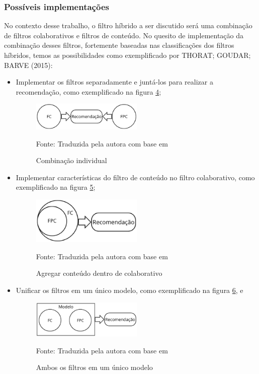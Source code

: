 \subsubsection{Possíveis implementações}\label{subsubsec:implemfh}
No contexto desse trabalho, o filtro híbrido a ser discutido será uma combinação de filtros colaborativos e filtros de 
conteúdo. No quesito de implementação da combinação desses filtros, fortemente baseadas nas classificações dos filtros 
híbridos, temos as possibilidades como exemplificado por THORAT; GOUDAR; BARVE (2015):

\begin{itemize}
    \item Implementar os filtros separadamente e juntá-los para realizar a recomendação, como exemplificado na figura
    \hyperref[fig:combind]{4};
    \begin{figure}[H]
        \centering
        \includegraphics[width=0.5\textwidth]{figuras/combin2.eps}
        \caption{Combinação individual}
        \label{fig:combind}
        \small Fonte: Traduzida pela autora com base em \cite{thorat2015survey}
    \end{figure}

    \item Implementar características do filtro de conteúdo no filtro colaborativo, como exemplificado na figura
    \hyperref[fig:cfcbf]{5};
    \begin{figure}[H]
        \centering
        \includegraphics[width=0.5\textwidth]{figuras/cfcbf2.eps}
        \caption{Agregar conteúdo dentro de colaborativo}
        \label{fig:cfcbf}
        \small Fonte: Traduzida pela autora com base em \cite{thorat2015survey}
    \end{figure}

    \item Unificar os filtros em um único modelo, como exemplificado na figura
    \hyperref[fig:modelounico]{6}, e
    \begin{figure}[H]
        \centering
        \includegraphics[width=0.5\textwidth]{figuras/modelounico2.eps}
        \caption{Ambos os filtros em um único modelo}
        \label{fig:modelounico}
        \small Fonte: Traduzida pela autora com base em \cite{thorat2015survey}
    \end{figure}


\end{itemize}

